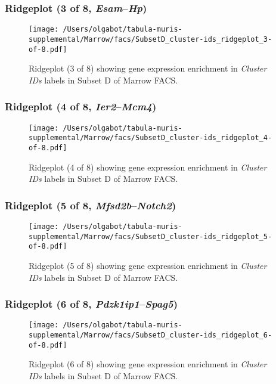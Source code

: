 \clearpage

\subsubsection{Ridgeplot (3 of 8, \emph{Esam}--\emph{Hp})}
\begin{figure}[h]
\centering
\texttt{[image: /Users/olgabot/tabula-muris-supplemental/Marrow/facs/SubsetD\_cluster-ids\_ridgeplot\_3-of-8.pdf]}

\caption{ Ridgeplot (3 of 8)  showing gene expression enrichment in \emph{Cluster IDs} labels in Subset D of Marrow FACS. }
\end{figure}


\clearpage

\subsubsection{Ridgeplot (4 of 8, \emph{Ier2}--\emph{Mcm4})}
\begin{figure}[h]
\centering
\texttt{[image: /Users/olgabot/tabula-muris-supplemental/Marrow/facs/SubsetD\_cluster-ids\_ridgeplot\_4-of-8.pdf]}

\caption{ Ridgeplot (4 of 8)  showing gene expression enrichment in \emph{Cluster IDs} labels in Subset D of Marrow FACS. }
\end{figure}


\clearpage

\subsubsection{Ridgeplot (5 of 8, \emph{Mfsd2b}--\emph{Notch2})}
\begin{figure}[h]
\centering
\texttt{[image: /Users/olgabot/tabula-muris-supplemental/Marrow/facs/SubsetD\_cluster-ids\_ridgeplot\_5-of-8.pdf]}

\caption{ Ridgeplot (5 of 8)  showing gene expression enrichment in \emph{Cluster IDs} labels in Subset D of Marrow FACS. }
\end{figure}


\clearpage

\subsubsection{Ridgeplot (6 of 8, \emph{Pdzk1ip1}--\emph{Spag5})}
\begin{figure}[h]
\centering
\texttt{[image: /Users/olgabot/tabula-muris-supplemental/Marrow/facs/SubsetD\_cluster-ids\_ridgeplot\_6-of-8.pdf]}

\caption{ Ridgeplot (6 of 8)  showing gene expression enrichment in \emph{Cluster IDs} labels in Subset D of Marrow FACS. }
\end{figure}


